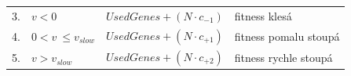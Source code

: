 \begin{table}[htb]
{\begin{tabular}{llll}
            3. &  $v < 0$                               & $\mathit{UsedGenes} + \left(N \cdot c_{-1}\right)$ & fitness klesá         \\
            4. &  $0 < v~\leq v_\mathit{slow}$              & $\mathit{UsedGenes} + \left(N \cdot c_{+1}\right)$ & fitness pomalu stoupá \\
            5. &  $v > v_\mathit{slow}$                 & $\mathit{UsedGenes} + \left(N \cdot c_{+2}\right)$ & fitness rychle stoupá \\
            \bottomrule
        \end{tabular}
        \label{tabBaldwinRulesAbs}
    }
    \label{tabBaldwinRules}
\end{table}








